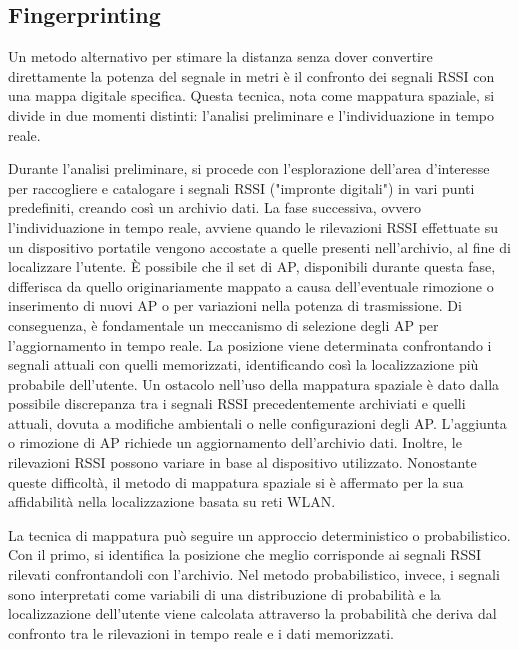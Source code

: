 \subsection{Fingerprinting}
\hspace{\parindent}Un metodo alternativo per stimare la distanza senza dover convertire direttamente la potenza del segnale in metri è il confronto dei segnali RSSI con una mappa digitale specifica. Questa tecnica, nota come mappatura spaziale, si divide in due momenti distinti: l'analisi preliminare e l'individuazione in tempo reale.

Durante l'analisi preliminare, si procede con l'esplorazione dell'area d'interesse per raccogliere e catalogare i segnali RSSI ("impronte digitali") in vari punti predefiniti, creando così un archivio dati. La fase successiva, ovvero l'individuazione in tempo reale, avviene quando le rilevazioni RSSI effettuate su un dispositivo portatile vengono accostate a quelle presenti nell'archivio, al fine di localizzare l'utente. È possibile che il set di AP, disponibili durante questa fase, differisca da quello originariamente mappato a causa dell'eventuale rimozione o inserimento di nuovi AP o per variazioni nella potenza di trasmissione. Di conseguenza, è fondamentale un meccanismo di selezione degli AP per l'aggiornamento in tempo reale. La posizione viene determinata confrontando i segnali attuali con quelli memorizzati, identificando così la localizzazione più probabile dell'utente. Un ostacolo nell'uso della mappatura spaziale è dato dalla possibile discrepanza tra i segnali RSSI precedentemente archiviati e quelli attuali, dovuta a modifiche ambientali o nelle configurazioni degli AP. L'aggiunta o rimozione di AP richiede un aggiornamento dell'archivio dati. Inoltre, le rilevazioni RSSI possono variare in base al dispositivo utilizzato. Nonostante queste difficoltà, il metodo di mappatura spaziale si è affermato per la sua affidabilità nella localizzazione basata su reti WLAN.

La tecnica di mappatura può seguire un approccio deterministico o probabilistico. Con il primo, si identifica la posizione che meglio corrisponde ai segnali RSSI rilevati confrontandoli con l'archivio. Nel metodo probabilistico, invece, i segnali sono interpretati come variabili di una distribuzione di probabilità e la localizzazione dell'utente viene calcolata attraverso la probabilità che deriva dal confronto tra le rilevazioni in tempo reale e i dati memorizzati.

